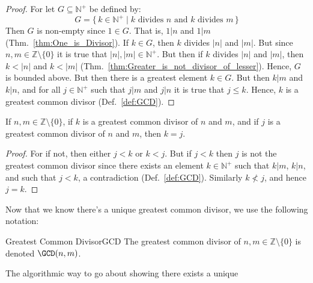 \documentclass{article}                                                        %
\begin{document}
            \begin{proof}
                For let $G\subseteq\mathbb{N}^{+}$ be defined by:
                \begin{equation}
                    G=\{\,k\in\mathbb{N}^{+}\;|\;
                        k\textrm{ divides }n\textrm{ and }
                        k\textrm{ divides }m\,\}
                \end{equation}
                Then $G$ is non-empty since $1\in{G}$. That is, $1|n$ and $1|m$
                (Thm.~\ref{thm:One_is_Divisor}). If $k\in{G}$, then
                $k$ divides $|n|$ and $|m|$. But since
                $n,m\in\mathbb{Z}\setminus\{0\}$ it is true that
                $|n|,|m|\in\mathbb{N}^{+}$. But then if $k$ divides $|n|$ and $|m|$,
                then $k<|n|$ and $k<|m|$
                (Thm.~\ref{thm:Greater_is_not_divisor_of_lesser}). Hence, $G$ is
                bounded above. But then there is a greatest element $k\in{G}$.
                But then $k|m$ and $k|n$, and for all $j\in\mathbb{N}^{+}$ such
                that $j|m$ and $j|n$ it is true that $j\leq{k}$. Hence, $k$ is
                a greatest common divisor (Def.~\ref{def:GCD}).
            \end{proof}
            \begin{theorem}
                \label{thm:GCD_Unique}%
                If $n,m\in\mathbb{Z}\setminus\{0\}$, if $k$ is a greatest common
                divisor of $n$ and $m$, and if $j$ is a greatest common
                divisor of $n$ and $m$, then $k=j$.
            \end{theorem}
            \begin{proof}
                For if not, then either $j<k$ or $k<j$. But if $j<k$ then $j$ is
                not the greatest common divisor since there exists an element
                $k\in\mathbb{N}^{+}$ such that $k|m$, $k|n$, and such that
                $j<k$, a contradiction (Def.~\ref{def:GCD}). Similarly
                $k\not<j$, and hence $j=k$.
            \end{proof}
            Now that we know there's a unique greatest common divisor, we
            use the following notation:
            \begin{fnotation}{Greatest Common Divisor}{GCD}
                The greatest common divisor of $n,m\in\mathbb{Z}\setminus\{0\}$
                is denoted $\GCD(n,m)$.
            \end{fnotation}
            The algorithmic way to go about showing there exists a unique
\end{document}
